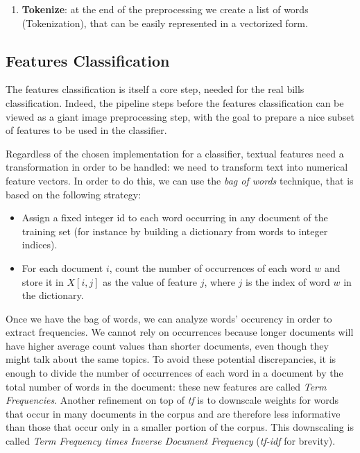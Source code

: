 \documentclass[10pt,twocolumn,letterpaper]{article}
\begin{document}
\begin{enumerate}
    the process of grouping together the inflected forms of a word, so
    they can be analysed as a single item, identified by the word's
    lemma, or dictionary form.\footnote{\href{
        https://en.wikipedia.org/wiki/Lemmatisation}{
        https://en.wikipedia.org/wiki/Lemmatisation}}. Thanks
    this step, indeed, we tried to group words together in order to
    simplify the classification phase. However, we noticed that this
    step does not improve the performance and it can also produce worse
    results as it tries to group wrong words retrieved from the OCR.
  \item \textbf{Tokenize}: at the end of the preprocessing we create a list of
    words (Tokenization), that can be easily represented in a
    vectorized form.
\end{enumerate}

\subsection{Features Classification}
\label{subsec:classification}

The features classification is itself a core step, needed for the real
bills classification. Indeed, the pipeline steps before the features
classification can be viewed as a giant image preprocessing step, with
the goal to prepare a nice subset of features to be used in the
classifier.

Regardless of the chosen implementation for a classifier, textual
features need a transformation in order to be handled: we need to
transform text into numerical feature vectors. In order to do this, we
can use the \emph{bag of words} technique, that is based on the
following strategy:

\begin{itemize}
  \item Assign a fixed integer id to each word occurring in any
    document of the training set (for instance by building a
    dictionary from words to integer indices).
  \item For each document $i$, count the number of occurrences of each
    word $w$ and store it in $X[i, j]$ as the value of feature $j$,
    where $j$ is the index of word $w$ in the dictionary.
\end{itemize}

Once we have the bag of words, we can analyze words' occurency in order
to extract frequencies. We cannot rely on occurrences because longer
documents will have higher average count values than shorter
documents, even though they might talk about the same topics. To avoid
these potential discrepancies, it is enough to divide the number of
occurrences of each word in a document by the total number of words in
the document: these new features are called \emph{Term
  Frequencies}. Another refinement on top of \emph{tf} is to downscale
weights for words that occur in many documents in the corpus and are
therefore less informative than those that occur only in a smaller
portion of the corpus. This downscaling is called \emph{Term Frequency
  times Inverse Document Frequency} (\emph{tf-idf} for brevity).
\end{document}
